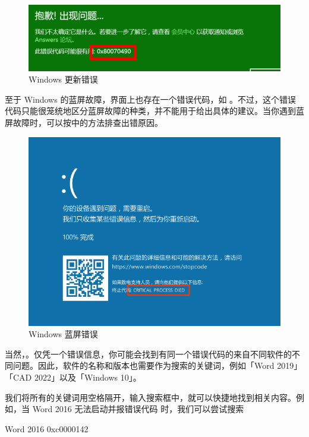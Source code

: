 \begin{figure}[htb!]
  \centering
  \includegraphics[width=.8\textwidth]{assets/basic/Green_err_code.png}
  \caption{Windows 更新错误}
  \label{fig:Green_err_code}
\end{figure}

至于 Windows 的蓝屏故障，界面上也存在一个错误代码，如 。不过，这个错误代码只能很笼统地区分蓝屏故障的种类，并不能用于给出具体的建议。当你遇到蓝屏故障时，可以按中的方法排查出错原因。

\begin{figure}[htb!]
  \centering
  \includegraphics[width=.65\textwidth]{assets/basic/Win-10-BSoD.png}
  \caption{Windows 蓝屏错误}
  \label{fig:Win-10-BSoD}
\end{figure}

当然，。仅凭一个错误信息，你可能会找到有同一个错误代码的来自不同软件的不同问题。因此，软件的名称和版本也需要作为搜索的关键词，例如「Word 2019」「CAD 2022」以及「Windows 10」。

我们将所有的关键词用空格隔开，输入搜索框中，就可以快捷地找到相关内容。例如，当 Word 2016 无法启动并报错误代码  时，我们可以尝试搜索

\begin{quoting}
  Word 2016 0xc0000142
\end{quoting}

